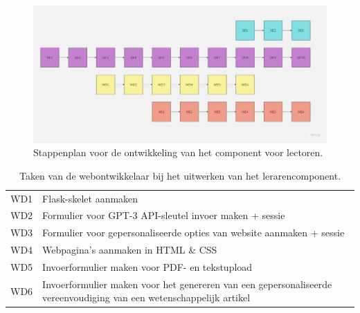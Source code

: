 \chapter{}%
\label{ch:stappenplan-prototype}

\begin{figure}[H]
	\includegraphics[width=\linewidth]{img/flowchart-development.jpg}
	\caption{Stappenplan voor de ontwikkeling van het component voor lectoren.}
	\label{img:stappenplan-leerkrachten}
\end{figure}

\begin{center}
	\begin{table}
		\begin{tabular}{ | m{2cm} | m{12cm} | } 
			\hline
			WD1 & Flask-skelet aanmaken \\
			WD2 & Formulier voor GPT-3 API-sleutel invoer maken + sessie \\
			WD3 & Formulier voor gepersonaliseerde opties van website aanmaken + sessie \\
			WD4 & Webpagina's aanmaken in HTML \& CSS \\
			WD5 & Invoerformulier maken voor PDF- en tekstupload \\
			WD6 & Invoerformulier maken voor het genereren van een gepersonaliseerde vereenvoudiging van een wetenschappelijk artikel \\
			\hline
		\end{tabular}
		\caption{Taken van de webontwikkelaar bij het uitwerken van het lerarencomponent.}
		\label{table:tasks-web-engineer}
	\end{table}
\end{center}

